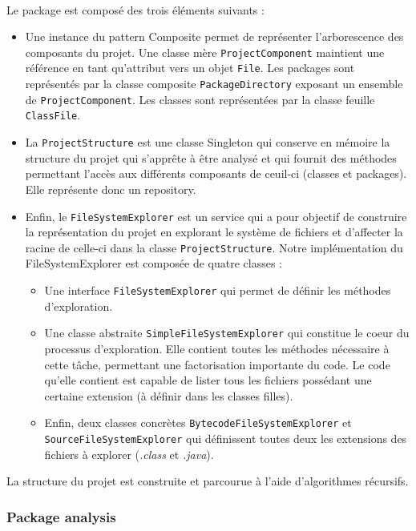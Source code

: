 \documentclass{scrartcl}
\begin{document}
	\paragraph{}Le package est composé des trois éléments suivants :
	\begin{itemize}
		\item Une instance du pattern Composite permet de représenter l’arborescence des composants du projet. Une classe mère \texttt{ProjectComponent} maintient une référence en tant qu’attribut vers un objet \texttt{File}. Les packages sont représentés par la classe composite \texttt{PackageDirectory} exposant un ensemble de \texttt{ProjectComponent}. Les classes sont représentées par la classe feuille \texttt{ClassFile}.
		\item La \texttt{ProjectStructure} est une classe Singleton qui conserve en mémoire la structure du projet qui s’apprête à être analysé et qui fournit des méthodes permettant l’accès aux différents composants de ceuil-ci (classes et packages). Elle représente donc un repository.
		\item Enfin, le \texttt{FileSystemExplorer} est un service qui a pour objectif de construire la représentation du projet en explorant le système de fichiers et d’affecter la racine de celle-ci dans la classe \texttt{ProjectStructure}. Notre implémentation du FileSystemExplorer est composée de quatre classes : 
		\begin{itemize}
		    \item Une interface \texttt{FileSystemExplorer} qui permet de définir les méthodes d'exploration.
		    \item Une classe abstraite \texttt{SimpleFileSystemExplorer} qui constitue le coeur du processus d'exploration. Elle contient toutes les méthodes nécessaire à cette tâche, permettant une factorisation importante du code. Le code qu'elle contient est capable de lister tous les fichiers possédant une certaine extension (à définir dans les classes filles).
		    \item Enfin, deux classes concrètes \texttt{BytecodeFileSystemExplorer} et \texttt{SourceFileSystemExplorer} qui définissent toutes deux les extensions des fichiers à explorer (\emph{.class} et \emph{.java}).
		\end{itemize}
	\end{itemize}
    La structure du projet est construite et parcourue à l'aide d’algorithmes récursifs.
    
\subsubsection{Package analysis}
\end{document}
